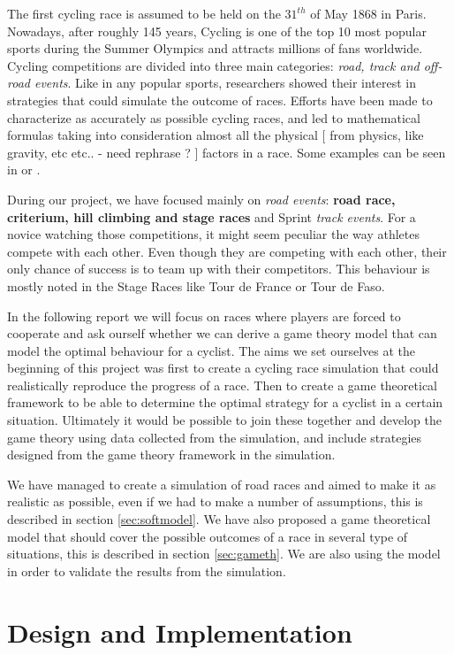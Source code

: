 \documentclass[10pt, a4paper]{report}
\begin{document}
The first cycling race is assumed to be held on the $31^{th}$ of May 1868 in Paris. Nowadays, after roughly 145 years, Cycling is one of the top 10 most popular sports during the Summer Olympics \cite{TopEndSportsUrl} and attracts millions of fans worldwide. Cycling competitions are divided into three main categories: \textit{road, track and off-road events}. Like in any popular sports, researchers showed their interest in strategies that could simulate the outcome of races. Efforts have been made to characterize as accurately as possible cycling races, and led to mathematical formulas taking into consideration almost all the physical [ from physics, like gravity, etc etc.. - need rephrase ? ] factors in a race. Some examples can be seen in \cite{AgentModel} or \cite{SlipStream} .

During our project, we have focused mainly on \textit{road events}: \textbf{road race, criterium, hill climbing and stage races} and Sprint \textit{track events}. For a novice watching those competitions, it might seem peculiar the way athletes compete with each other. Even though they are competing  with each other, their only chance of success is to team up with their competitors. This behaviour is mostly noted in the Stage Races like Tour de France or Tour de Faso.

In the following report we will focus on races where players are forced to cooperate and ask ourself  whether we can derive a game theory model that can model the optimal behaviour for a cyclist. The aims we set ourselves at the beginning of this project was first to create a cycling race simulation that could realistically reproduce the progress of a race. Then to create a game theoretical framework to be able to determine the optimal strategy for a cyclist in a certain situation. Ultimately it would be possible to join these together and develop the game theory using data collected from the simulation, and include strategies designed from the game theory framework in the simulation.

We have managed to create a simulation of road races and aimed to make it as realistic as possible, even if we had to make a number of assumptions, this is described in section \ref{sec:softmodel}. We have also proposed a game theoretical model that should cover the possible outcomes of a race in several type of situations, this is described in section \ref{sec:gameth}. We are also using the model in order to validate the results from the simulation.


\chapter{Design and Implementation}\label{ch:design&impl}
\end{document}
